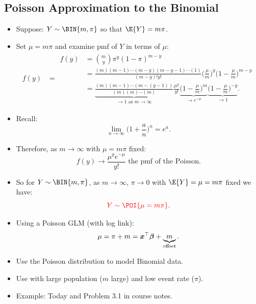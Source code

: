 \documentclass[oneside]{book}\usepackage[]{graphicx}\usepackage[svgnames]{xcolor}
\let\log\relax%
\providecommand{\Vector}[1]{\bm{#1}}%
\begin{document}
\subsection*{Poisson Approximation to the Binomial}
\begin{itemize}
    \item Suppose: \textcolor{Red}{$Y \sim \BIN{m,\pi}$} so that $ \E{Y}=m\pi $.
    \item Set $ \mu=m\pi $ and examine pmf of $ Y $ in terms of $ \mu $:
          \begin{align*}
              f(y)
               & =\begin{aligned}
                      f(y) & =\binom{m}{y} \pi^{y}(1-\pi)^{m-y}                                                                                           \\
                           & =\frac{(m)(m-1) \cdots(m-y)(m-y-1) \cdots(1)}{(m-y) ! y !}\biggl(\frac{\mu}{m}\biggr)^{y}\biggl(1-\frac{\mu}{m}\biggr)^{m-y} \\
                           & =\underbrace{\frac{(m)(m-1) \cdots(m-(y-1))}{(m)(m) \cdots(m)}}_{\to 1 \text{ as } m \to \infty} \frac{\mu^{y}}{y !}
                      \underbrace{\biggr(1-\frac{\mu}{m}\biggr)^{m}}_{\to e^{-\mu}} \underbrace{\biggl(1-\frac{\mu}{m}\biggr)^{-y}}_{\to 1}.
                  \end{aligned}
          \end{align*}
    \item Recall:
          \[ \lim\limits_{{n} \to {\infty}}\biggl(1+\frac{a}{n}\biggr)^{\!n}=e^a. \]
    \item Therefore, as $ m\to\infty $ with $ \mu=m\pi $ fixed:
          \[ f(y)\to \frac{\mu^y e^{-\mu}}{y!}\text{ the pmf of the Poisson.} \]
    \item So for $ Y \sim \BIN{m,\pi} $, as $ m\to\infty $, $ \pi\to 0 $ with $ \E{Y}=\mu=m\pi $ fixed we have:
          \[ \textcolor{Red}{Y \sim \POI{\mu=m\pi}}. \]
    \item Using a Poisson GLM (with log link):
          \[ \log{\mu}=\log{\pi}+\log{m}=\Vector{x}^\top \Vector{\beta}+\underbrace{\log{m}}_\text{offset}. \]
    \item Use the Poisson distribution to model Binomial data.
    \item Use with large population ($m$ large) and low event rate ($ \pi $).
    \item Example: Today and Problem 3.1 in course notes.
\end{itemize}
\end{document}
